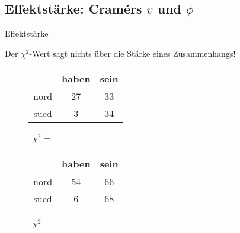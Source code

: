\subsection[Effektstärke]{Effektstärke: Cramérs $v$ und $\phi$}

\begin{frame}{Effektstärke}

  Der $\chi^2$-Wert sagt nichts über die \alert{Stärke eines Zusammenhangs}!\\

  \begin{figure}[h]
    \centering
    \begin{tabular}{|c|c|c|}
      \hline
      &  haben & sein\\
      \hline
      nord   &  27      & 33 \\
      \hline
	sued   &   3      & 34 \\
      \hline
    \end{tabular}~$\chi^2$ = ~
  \end{figure}

  \begin{figure}[h]
    \centering
    \begin{tabular}{|c|c|c|}
      \hline
	    &  haben & sein\\
      \hline
	nord   &  54      & 66 \\
      \hline
	sued   &  6     & 68 \\
      \hline
      \end{tabular}~$\chi^2$ = ~
  \end{figure}
\end{frame}


